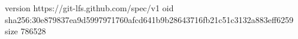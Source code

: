 version https://git-lfs.github.com/spec/v1
oid sha256:30e879837ea9d5997971760afcd641b9b28643716fb21c51c3132a883eff6259
size 786528
